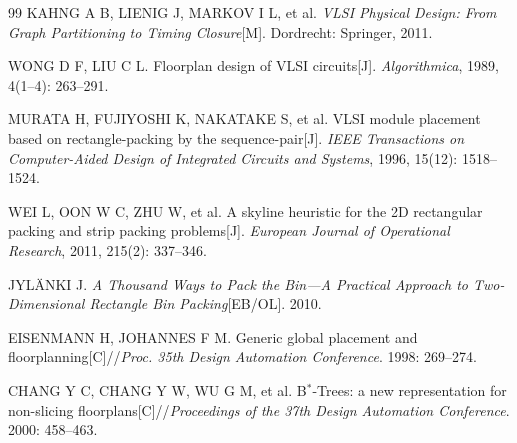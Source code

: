 \begin{thebibliography}{99}
  \sloppy
  KAHNG A B, LIENIG J, MARKOV I L, et al. \textit{VLSI Physical Design: From Graph Partitioning to Timing Closure}[M]. Dordrecht: Springer, 2011.

  WONG D F, LIU C L. Floorplan design of VLSI circuits[J]. \textit{Algorithmica}, 1989, 4(1--4): 263--291.

  MURATA H, FUJIYOSHI K, NAKATAKE S, et al. VLSI module placement based on rectangle-packing by the sequence-pair[J]. \textit{IEEE Transactions on Computer-Aided Design of Integrated Circuits and Systems}, 1996, 15(12): 1518--1524.

  WEI L, OON W C, ZHU W, et al. A skyline heuristic for the 2D rectangular packing and strip packing problems[J]. \textit{European Journal of Operational Research}, 2011, 215(2): 337--346.

  JYL\"ANKI J. \textit{A Thousand Ways to Pack the Bin---A Practical Approach to Two-Dimensional Rectangle Bin Packing}[EB/OL]. 2010.

  EISENMANN H, JOHANNES F M. Generic global placement and floorplanning[C]//\textit{Proc. 35th Design Automation Conference}. 1998: 269--274.

  CHANG Y C, CHANG Y W, WU G M, et al. B$^*$-Trees: a new representation for non-slicing floorplans[C]//\textit{Proceedings of the 37th Design Automation Conference}. 2000: 458--463.
\end{thebibliography}
